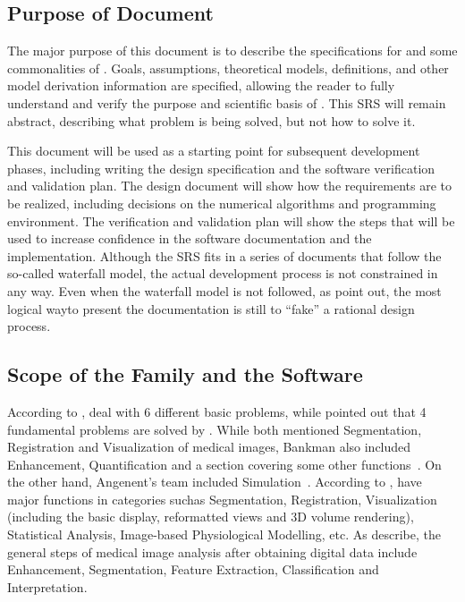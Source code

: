 \documentclass[12pt]{article}
\begin{document}
\subsection{Purpose of Document}

The major purpose of this document is to describe the specifications for
\progname and some commonalities of \famname. Goals, assumptions, theoretical
models, definitions, and other model derivation information are specified,
allowing the reader to fully understand and verify the purpose and scientific
basis of \famname. This SRS will remain abstract, describing what problem is
being solved, but not how to solve it.

This document will be used as a starting point for subsequent development
phases, including writing the design specification and the software
verification and validation plan. The design document will show how the
requirements are to
be realized, including decisions
on the numerical algorithms and programming environment. The verification and
validation plan will show the steps that will be used to increase confidence in
the software documentation and the implementation. Although the SRS fits in a
series of documents that follow the so-called waterfall model, the actual
development process is not constrained in any way. Even when the waterfall
model is not followed, as \cite{ParnasAndClements1986} point out, the most
logical wayto present the documentation is still to “fake” a rational design
process.

\subsection{Scope of the Family and the Software} 

According to \cite{Bankman2000}, \famname{} deal with 6 different basic
problems, while \cite{Angenent2006} pointed out that 4 fundamental problems are
solved by \famname. While both mentioned Segmentation, Registration and
Visualization of medical images, Bankman also included Enhancement,
Quantification and a section covering some other functions~\cite{Bankman2000}.
On the other hand, Angenent's team included Simulation~\cite{Angenent2006}.
According to \cite{wiki:001}, \famname{} have major functions in categories
suchas Segmentation, Registration, Visualization (including the basic display,
reformatted views and 3D volume rendering), Statistical Analysis, Image-based
Physiological Modelling, etc. As \cite{Kim2011} describe, the general steps of
medical image analysis after obtaining digital data include Enhancement,
Segmentation, Feature Extraction, Classification and Interpretation.
\end{document}
